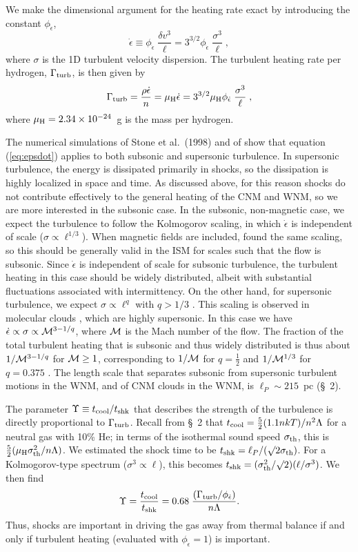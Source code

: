 \documentclass[12pt,preprint,flushrt]{aastex}
\newcommand{\beq}{\begin{equation}}
\newcommand{\eeq}{\end{equation}}
\newcommand{\calm}{{\cal M}}
\newcommand{\ellp}{\ell_{P}}
\newcommand{\sth}{\sigma_{\rm th}}
\newcommand{\phied}{\phi_{{\dot\epsilon}}}
\newcommand{\gturb}{\Gamma_{\rm turb}}
\newcommand{\muh}{\mu_{\rm H}}
\begin{document}
  We make the dimensional argument for the heating
rate 
exact by introducing the constant $\phied$,
\beq
\dot\epsilon\equiv\phied\;\frac{\delta v^3}{\ell}
        =3^{3/2}\phied\;\frac{\sigma^3}{\ell}\;,
\label{eq:epsdot}
\eeq
where $\sigma$ is the 1D turbulent velocity dispersion.
The turbulent heating rate per hydrogen, $\gturb$,
is then given by
\beq
\gturb  =  \frac{\rho\dot\epsilon}{n}=\muh\dot\epsilon
        = 3^{3/2}\muh \phied \;\frac{\sigma^3}{\ell}\;,
\label{eq:gturb}
\eeq
where $\muh=2.34\times 10^{-24}$~g is the mass per hydrogen.

      The numerical simulations of Stone et al.\ (1998) and of \cite{mac99}
 show that equation (\ref{eq:epsdot}) applies to both subsonic
and supersonic turbulence.  In supersonic turbulence, the energy is
dissipated primarily in shocks, so the dissipation is highly localized
in space and time.  As discussed above, for this reason
shocks do not contribute
effectively to the general heating of the CNM and WNM, so we are more
interested in the subsonic case.  In the subsonic,
non-magnetic case, we expect the
turbulence to follow the Kolmogorov scaling, in which $\dot\epsilon$
is independent of scale ($\sigma\propto \ell^{1/3}$).
When magnetic fields are included, \cite{gold95}  found
the same scaling, so this should be generally valid in the
ISM for scales such that the flow is subsonic.
Since $\dot\epsilon$ is independent of scale for subsonic turbulence,
the turbulent heating in this case should be widely distributed,
albeit with substantial fluctuations associated with intermittency.
On the other hand,
for supersonic turbulence, we expect 
$\sigma\propto \ell^{q}$ with $q > 1/3$
\citep{lar79,bold02}. 
This scaling is
observed in molecular clouds \citep{hey97},
which are highly supersonic.
In this case we have
$\dot\epsilon\propto\sigma\propto\calm^{3-1/q}$, where $\calm$ is the
Mach number of the flow.  The fraction of the total turbulent heating
that is subsonic and thus widely distributed is thus about $1/\calm^{3-1/q}$
for $\calm\geq 1$, corresponding to $1/\calm$ for $q=\frac 12$ \citep{lar79}
and $1/\calm^{1/3}$ for $q=0.375$ \citep{bold02}.
The length scale that separates subsonic from supersonic
turbulent motions in the WNM, and of CNM clouds in the WNM,
is $\ellp\sim 215$~pc (\S\ 2).

The parameter $\Upsilon\equiv t_{\rm cool}/t_{\rm shk}$
that describes the strength
of the turbulence is directly proportional to $\gturb$.
Recall from \S\ 2 that $t_{\rm cool}=\frac 52 (1.1 nkT)/n^2\Lambda$
for a neutral gas with 10\% He; in
terms of the isothermal sound speed $\sth$,
this is $\frac 52 (\muh\sth^2
/n\Lambda)$. We estimated the shock time to be $t_{\rm shk}
=\ell_P/(\surd 2\sth)$.  For a Kolmogorov-type spectrum
($\sigma^3\propto \ell$), this becomes $t_{\rm shk}=(\sth^2/\surd
2)(\ell/\sigma^3)$.  We then find
\beq
\Upsilon=\frac{t_{\rm cool}}{t_{\rm shk}}
        =0.68\;\frac{(\gturb/\phied)}{n\Lambda}.
\label{eq:upsilonturb}
\eeq
Thus, shocks are important in driving the gas away from thermal
balance if and only if turbulent heating (evaluated with
$\phied=1$) is important.
\end{document}
